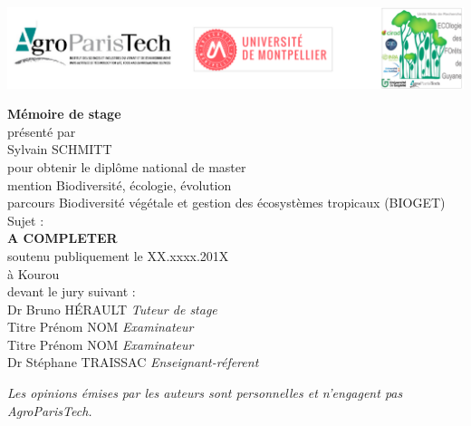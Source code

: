 \includegraphics{images/logos}

\begin{center}
  \LARGE{\textbf{Mémoire de stage}} \\
  \vspace*{\fill}
  \large{présenté par} \\
  \large{Sylvain SCHMITT} \\
  \vspace*{\fill}
  \large{pour obtenir le diplôme national de master} \\
  \large{mention Biodiversité, écologie, évolution} \\
  \small{parcours Biodiversité végétale et gestion des écosystèmes tropicaux (BIOGET)} \\
  \vspace*{\fill}
  \large{Sujet :} \\
  \Large{\textbf{A COMPLETER}} \\
  \vspace*{\fill}
  \large{soutenu publiquement le XX.xxxx.201X} \\
  \large{à Kourou} \\
  \vspace*{\fill}
  \large{devant le jury suivant :} \\
  \vspace*{\fill}
  Dr Bruno HÉRAULT  \emph{Tuteur de stage} \\
  Titre Prénom NOM  \emph{Examinateur} \\
  Titre Prénom NOM  \emph{Examinateur} \\
  Dr Stéphane TRAISSAC  \emph{Enseignant-réferent} \\
\end{center}

\newpage
\vspace*{\fill}
\emph{Les opinions émises par les auteurs sont personnelles et n'engagent pas AgroParisTech.}
\newpage

